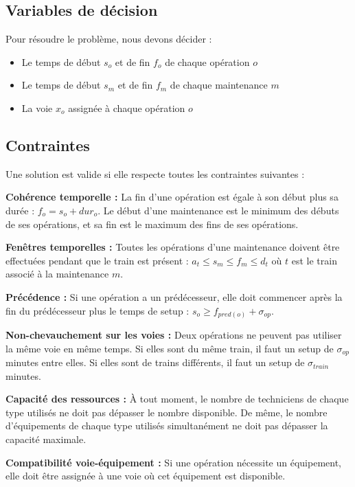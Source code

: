 \subsection{Variables de décision}

Pour résoudre le problème, nous devons décider :
\begin{itemize}
    \item Le temps de début $s_o$ et de fin $f_o$ de chaque opération $o$
    \item Le temps de début $s_m$ et de fin $f_m$ de chaque maintenance $m$
    \item La voie $x_o$ assignée à chaque opération $o$
\end{itemize}

\subsection{Contraintes}

Une solution est valide si elle respecte toutes les contraintes suivantes :

\textbf{Cohérence temporelle :} La fin d'une opération est égale à son début plus sa durée : $f_o = s_o + dur_o$. Le début d'une maintenance est le minimum des débuts de ses opérations, et sa fin est le maximum des fins de ses opérations.

\textbf{Fenêtres temporelles :} Toutes les opérations d'une maintenance doivent être effectuées pendant que le train est présent : $a_t \leq s_m \leq f_m \leq d_t$ où $t$ est le train associé à la maintenance $m$.

\textbf{Précédence :} Si une opération a un prédécesseur, elle doit commencer après la fin du prédécesseur plus le temps de setup : $s_o \geq f_{pred(o)} + \sigma_{op}$.

\textbf{Non-chevauchement sur les voies :} Deux opérations ne peuvent pas utiliser la même voie en même temps. Si elles sont du même train, il faut un setup de $\sigma_{op}$ minutes entre elles. Si elles sont de trains différents, il faut un setup de $\sigma_{train}$ minutes.

\textbf{Capacité des ressources :} À tout moment, le nombre de techniciens de chaque type utilisés ne doit pas dépasser le nombre disponible. De même, le nombre d'équipements de chaque type utilisés simultanément ne doit pas dépasser la capacité maximale.

\textbf{Compatibilité voie-équipement :} Si une opération nécessite un équipement, elle doit être assignée à une voie où cet équipement est disponible.

